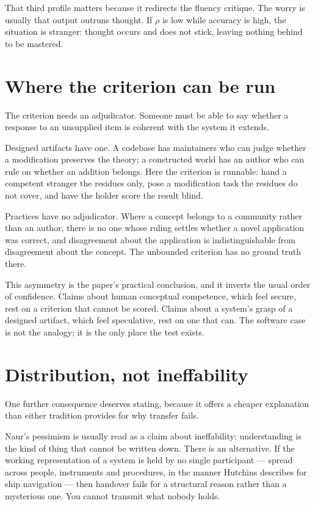 \documentclass[11pt,a4paper]{article}
\begin{document}
That third profile matters because it redirects the fluency critique. The worry is usually that output outruns thought. If $\rho$ is low while accuracy is high, the situation is stranger: thought occurs and does not stick, leaving nothing behind to be mastered.

\section{Where the criterion can be run}
The criterion needs an adjudicator. Someone must be able to say whether a response to an unsupplied item is coherent with the system it extends.

Designed artifacts have one. A codebase has maintainers who can judge whether a modification preserves the theory; a constructed world has an author who can rule on whether an addition belongs. Here the criterion is runnable: hand a competent stranger the residues only, pose a modification task the residues do not cover, and have the holder score the result blind.

Practices have no adjudicator. Where a concept belongs to a community rather than an author, there is no one whose ruling settles whether a novel application was correct, and disagreement about the application is indistinguishable from disagreement about the concept. The unbounded criterion has no ground truth there.

This asymmetry is the paper's practical conclusion, and it inverts the usual order of confidence. Claims about human conceptual competence, which feel secure, rest on a criterion that cannot be scored. Claims about a system's grasp of a designed artifact, which feel speculative, rest on one that can. The software case is not the analogy; it is the only place the test exists.

\section{Distribution, not ineffability}
One further consequence deserves stating, because it offers a cheaper explanation than either tradition provides for why transfer fails.

Naur's pessimism is usually read as a claim about ineffability: understanding is the kind of thing that cannot be written down. There is an alternative. If the working representation of a system is held by no single participant --- spread across people, instruments and procedures, in the manner Hutchins describes for ship navigation --- then handover fails for a structural reason rather than a mysterious one. You cannot transmit what nobody holds.
\end{document}
